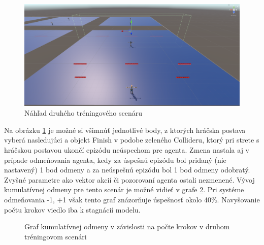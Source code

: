 \documentclass[slovak, master]{diploma}
\begin{document}
\begin{figure}[!htbp]
    \centering
    \includegraphics[width=.8\textwidth]{Figures/scenar2.png}
    \caption{Náhľad druhého tréningového scenáru}
    \label{pic:secondScenario}
\end{figure}

Na obrázku \ref{pic:secondScenario} je možné si všimnúť jednotlivé body, z ktorých hráčska postava vyberá nasledujúci a objekt Finish v podobe zeleného Collideru, ktorý pri strete s hráčskou postavou ukončí epizódu neúspechom pre agenta. Zmena nastala aj v prípade odmeňovania agenta, kedy za úspešnú epizódu bol pridaný (nie nastavený) 1 bod odmeny a za neúspešnú epizódu bol 1 bod odmeny odobratý. Zvyšné parametre ako vektor akcií či pozorovaní agenta ostali nezmenené. Vývoj kumulatívnej odmeny pre tento scenár je možné vidieť v grafe \ref{plt:secondScenario}. Pri systéme odmeňovania -1, +1 však tento graf znázorňuje úspešnosť okolo 40\%. Navyšovanie počtu krokov viedlo iba k stagnácií modelu.

\begin{figure}[!htbp]
    \centering
    \caption{Graf kumulatívnej odmeny v závislosti na počte krokov v druhom tréningovom scenári}
    \label{plt:secondScenario}
\end{figure}
\end{document}
